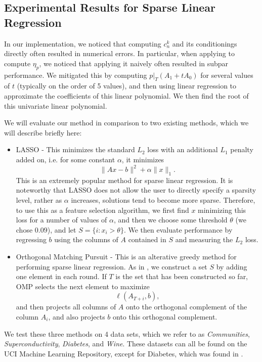 \documentclass{amsart}
\theoremstyle{definition}
\begin{document}
\subsection{Experimental Results for Sparse Linear Regression}
\label{subsec:expReg}
In our implementation, we noticed that computing $c_n^k$ and its conditionings directly often resulted in numerical errors.
In particular, when applying  to compute $\eta_{p}$, we noticed that applying it naively often resulted in subpar performance.
We mitigated this by computing $p|_T(A_1 + t A_0)$ for several values of $t$ (typically on the order of 5 values), and then using linear regression to approximate the coefficients of this linear polynomial.
We then find the root of this univariate linear polynomial.

We will evaluate our method in comparison to two existing methods, which we will describe briefly here:
\begin{itemize}
    \item LASSO\cite{tibshirani1996regression} - This minimizes the standard $L_2$ loss with an additional $L_1$ penalty added on, i.e. for some constant $\alpha$, it minimizes
    \[
        \|A x - b\|^2 + \alpha \|x\|_1.
    \]
    This is an extremely popular method for sparse linear regression.
    It is noteworthy that LASSO does not allow the user to directly specify a sparsity level, rather as $\alpha$ increases, solutions tend to become more sparse.
    Therefore, to use this as a feature selection algorithm, we first find $x$ minimizing this loss for a number of values of $\alpha$, and then we choose some threshold $\theta$ (we chose $0.09$), and let $S = \{i : x_i > \theta\}$.
    We then evaluate performance by regressing $b$ using the columns of $A$ contained in $S$ and measuring the $L_2$ loss.
    \item Orthogonal Matching Pursuit\cite{tropp2004greed} - This is an alterative greedy method for performing sparse linear regression. As in , we construct a set $S$ by adding one element in each round.
    If $T$ is the set that has been constructed so far, OMP selects the next element to maximize
    \[
        \ell(A_{T+i}, b),
    \]
    and then projects all columns of $A$ onto the orthogonal complement of the column $A_i$, and also projects $b$ onto this orthogonal complement.
\end{itemize}
We test these three methods on 4 data sets, which we refer to as \emph{Communities}, \emph{Superconductivity}, \emph{Diabetes}, and \emph{Wine}.
These datasets can all be found on the UCI Machine Learning Repository\cite{Dua:2019}, except for Diabetes, which was found in \cite{efron2004least}.
\end{document}

